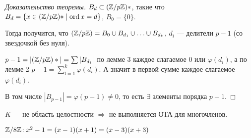 \begin{proof}[Доказательство теоремы] 
    $B_d \subset (\mathbb{Z} / p\mathbb{Z})*$, такие что $B_d = \{x \in (\mathbb{Z} / p \mathbb{Z})* \mid \operatorname{ord} x = d\}$,  $B_0 = \{0\}$. 

    Тогда получится, что  $(\mathbb{Z} / p \mathbb{Z}) = B_0 \cup B_{d_1} \cup \ldots \cup B_{d_k}$, $d_i$ --- делители $p - 1$ (со звездочкой без нуля). 

    $p-1 = |(\mathbb{Z} / p \mathbb{Z})*| = \sum |B_{d_i}|$ по лемме 3  каждое слагаемое  $0$ или  $\varphi(d_i)$, а по лемме 2 $p - 1 = \sum_{l = 1}^k \varphi(d_i)$. А значит в первой сумме каждое слагаемое  $\varphi(d_i)$. 

    В том числе  $|B_{p-1}| = \varphi(p - 1) \neq 0$, то есть  $\exists $ элементы порядка  $p-1$.
\end{proof}
\begin{remark}
    $K$ --- не область целостности  $\Rightarrow$ не выполняется ОТА для многочленов.
    
    $\mathbb{Z} / 8\mathbb{Z}\!: x^2-1 = (x-1)(x+1) = (x-3)(x+3)$
\end{remark}
